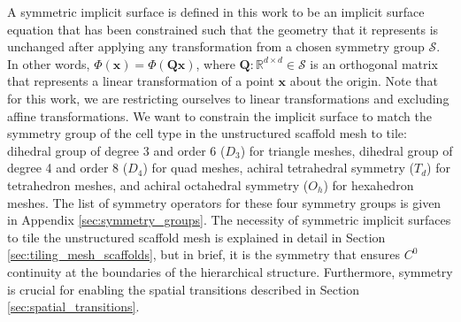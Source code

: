 \documentclass[acmtog]{acmart}
\begin{document}
A symmetric implicit surface is defined in this work to be an implicit surface equation that has been constrained such that the geometry that it represents is unchanged after applying any transformation from a chosen symmetry group $\mathcal{S}$. In other words, $\Phi(\mathbf{x}) = \Phi(\mathbf{Q} \mathbf{x})$, where $\mathbf{Q}: \mathbb{R}^{d \times d} \in \mathcal{S}$ is an orthogonal matrix that represents a linear transformation of a point $\mathbf{x}$ about the origin. Note that for this work, we are restricting ourselves to linear transformations and excluding affine transformations. We want to constrain the implicit surface to match the symmetry group of the cell type in the unstructured scaffold mesh to tile: dihedral group of degree 3 and order 6 ($D_3$) for triangle meshes, dihedral group of degree 4 and order 8 ($D_4$) for quad meshes, achiral tetrahedral symmetry ($T_d$) for tetrahedron meshes, and achiral octahedral symmetry ($O_h$) for hexahedron meshes. The list of symmetry operators for these four symmetry groups is given in Appendix \ref{sec:symmetry_groups}. The necessity of symmetric implicit surfaces to tile the unstructured scaffold mesh is explained in detail in Section \ref{sec:tiling_mesh_scaffolds}, but in brief, it is the symmetry that ensures $C^0$ continuity at the boundaries of the hierarchical structure. Furthermore, symmetry is crucial for enabling the spatial transitions described in Section \ref{sec:spatial_transitions}.
\end{document}

